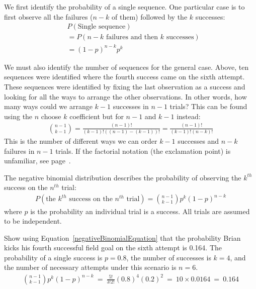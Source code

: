 We first identify the probability of a single sequence. One particular case is to first observe all the failures ($n-k$ of them) followed by the $k$ successes:
\begin{align*}
&P(\text{Single sequence}) \\
&= P(\text{$n-k$ failures and then $k$ successes}) \\
&= (1-p)^{n-k} p^{k}
\end{align*}

We must also identify the number of sequences for the general case. Above, ten sequences were identified where the fourth success came on the sixth attempt. These sequences were identified by fixing the last observation as a success and looking for all the ways to arrange the other observations. In other words, how many ways could we arrange $k-1$ successes in $n-1$ trials? This can be found using the $n$ choose $k$ coefficient but for $n-1$ and $k-1$ instead:
\begin{eqnarray*}
{n-1 \choose k-1} = \frac{(n-1)!}{(k-1)! \left((n-1) - (k-1)\right)!} = \frac{(n-1)!}{(k-1)! \left(n - k\right)!}
\end{eqnarray*}
This is the number of different ways we can order $k-1$ successes and $n-k$ failures in $n-1$ trials. If the factorial notation (the exclamation point) is unfamiliar, see page~\pageref{factorialDefinitionInTheBinomialSection}.

\begin{termBox}{
The negative binomial distribution describes the probability of observing the $k^{th}$ success on the $n^{th}$ trial:
\begin{eqnarray}
P(\text{the $k^{th}$ success on the $n^{th}$ trial}) = {n-1 \choose k-1} p^{k}(1-p)^{n-k}
\label{negativeBinomialEquation}
\end{eqnarray}
where $p$ is the probability an individual trial is a success. All trials are assumed to be independent.}
\end{termBox}

\begin{example}{Show using Equation~\eqref{negativeBinomialEquation} that the probability Brian kicks his fourth successful field goal on the sixth attempt is 0.164.}
The probability of a single success is $p=0.8$, the number of successes is $k=4$, and the number of necessary attempts under this scenario is $n=6$.
\begin{align*}
{n-1 \choose k-1}p^k(1-p)^{n-k}\ 
	=\ \frac{5!}{3!2!} (0.8)^4 (0.2)^2\ 
	=\ 10\times 0.0164\ 
	=\ 0.164
\end{align*}
\end{example}

